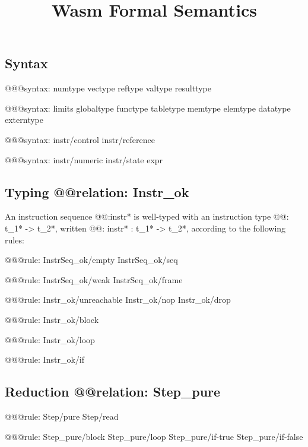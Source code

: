 \documentclass[a4paper]{scrartcl}
\title{Wasm Formal Semantics}
\begin{document}
\small

\maketitle


\subsection*{Syntax}

@@@{syntax: numtype vectype reftype valtype resulttype}

@@@{syntax:
  limits
  globaltype
  functype
  tabletype
  memtype
  elemtype
  datatype
  externtype
}

@@@{syntax: instr/control instr/reference}

@@@{syntax: instr/numeric instr/state expr}


\subsection*{Typing @@{relation: Instr_ok}}

An instruction sequence @@{:instr*} is well-typed with an instruction type @@{: t_1* -> t_2*}, written @@{: instr* : t_1* -> t_2*}, according to the following rules:

@@@{rule: InstrSeq_ok/empty InstrSeq_ok/seq}

@@@{rule: InstrSeq_ok/weak InstrSeq_ok/frame}


@@@{rule: Instr_ok/unreachable Instr_ok/nop Instr_ok/drop}

@@@{rule: Instr_ok/block}

@@@{rule: Instr_ok/loop}

@@@{rule: Instr_ok/if}


\subsection*{Reduction @@{relation: Step_pure}}

@@@{rule: Step/pure Step/read}

@@@{rule: Step_pure/block Step_pure/loop Step_pure/if-true Step_pure/if-false}
\end{document}
